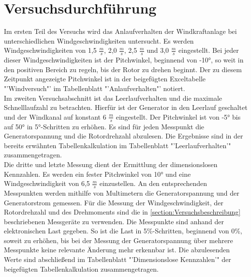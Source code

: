 \section{Versuchsdurchführung}
\label{section:Versuchsdurchführung}
Im ersten Teil des Versuchs wird das Anlaufverhalten der Windkraftanlage bei unterschiedlichen Windgeschwindigkeiten untersucht.
Es werden Windgeschwindigkeiten von 1,5 $\frac{m}{s}$, 2,0 $\frac{m}{s}$, 2,5 $\frac{m}{s}$ und 3,0 $\frac{m}{s}$ eingestellt.
Bei jeder dieser Windgeschwindigkeiten ist der Pitchwinkel, beginnend von -10°, so weit in den positiven Bereich zu regeln, bis der Rotor zu drehen beginnt. Der zu diesem Zeitpunkt angezeigte Pitchwinkel ist in der beigefügten Exceltabelle "'Windversuch"' im Tabellenblatt "'Anlaufverhalten"' notiert.\\
Im zweiten Versuchsabschnitt ist das Leerlaufverhalten und die maximale Schnelllaufzahl zu betrachten.
Hierfür ist der Generator in den Leerlauf geschaltet und der Windkanal auf konstant 6 $\frac{m}{s}$ eingestellt.
Der Pitchwinkel ist von -5° bis auf 50° in 5°-Schritten zu erhöhen.
Es sind für jeden Messpunkt die Generatorspannung und die Rotordrehzahl abzulesen.
Die Ergebnisse sind in der bereits erwähnten Tabellenkalkulation im Tabellenblatt "'Leerlaufverhalten'" zusammengetragen.\\
Die dritte und letzte Messung dient der Ermittlung der dimensionslosen Kennzahlen.
Es werden ein fester Pitchwinkel von 10° und eine Windgeschwindigkeit von 6,5 $\frac{m}{s}$ einzustellen.
An den entsprechenden Messpunkten werden mithilfe von  Multimetern die Generatorspannung und der Generatorstrom gemessen.
Für die Messung der Windgeschwindigkeit, der Rotordrehzahl und des Drehmoments sind die in \autoref{section:Versuchsbeschreibung} beschriebenen Messgeräte zu verwenden.
Die Messpunkte sind anhand der elektronischen Last gegeben. So ist die Last in 5\%-Schritten, beginnend von 0\%, soweit zu erhöhen, bis bei der Messung der Generatorspannung über mehrere Messpunkte keine relevante Änderung mehr erkennbar ist.
Die abzulesenden Werte sind abschließend im Tabellenblatt "'Dimensionslose Kennzahlen'" der beigefügten Tabellenkalkulation zusammengetragen.